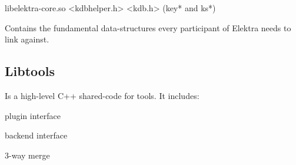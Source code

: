 \begin{DoxyVerb}libelektra-core.so
<kdbhelper.h>
<kdb.h> (key* and ks*)
\end{DoxyVerb}


Contains the fundamental data-\/structures every participant of Elektra needs to link against.

\subsection*{Libtools}

Is a high-\/level C++ shared-\/code for tools. It includes\+:


\begin{DoxyItemize}
\item plugin interface
\item backend interface
\item 3-\/way merge 
\end{DoxyItemize}